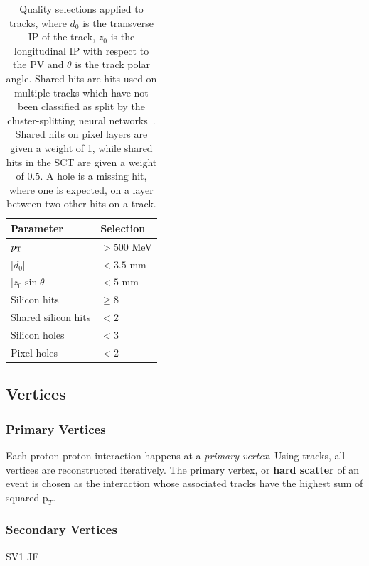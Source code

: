 \begin{table}[!htbp]
  \footnotesize\centering
  \setlength{\tabcolsep}{0.5em} %
  \caption{
    Quality selections applied to tracks,
    where $d_0$ is the transverse IP of the track, $z_0$ is the longitudinal IP with respect to the PV and $\theta$ is the track polar angle.
    Shared hits are hits used on multiple tracks which have not been classified as split by the cluster-splitting neural networks~\cite{PERF-2015-08}.
    Shared hits on pixel layers are given a weight of 1, while shared hits in the SCT are given a weight of 0.5.
    A hole is a missing hit, where one is expected, on a layer between two other hits on a track.
    }
  \begin{tabular}{ll}
    \toprule 
    \textbf{Parameter} & \textbf{Selection} \\
    \hline
    $p_{\text{T}}$                & $> 500$ MeV \\
    $|d_0|$              & $< 3.5$ mm \\
    $|z_0 \sin\theta|$   & $< 5$ mm \\
    Silicon hits         & $\ge 8$ \\
    Shared silicon hits  & $< 2$ \\
    Silicon holes        & $< 3$ \\
    Pixel holes          & $< 2$ \\
    \bottomrule
  \end{tabular}
  \vspace{4mm}
  \label{tab:track_selections}
\end{table}


\subsection{Vertices}

\subsubsection{Primary Vertices}
Each proton-proton interaction happens at a \textit{primary vertex}. 
Using tracks, all vertices are reconstructed iteratively. The primary vertex, or \textbf{hard scatter} of an event is chosen as the interaction whose associated tracks have the highest sum of squared $\mathrm{p}_T$.

\subsubsection{Secondary Vertices}
SV1 JF


